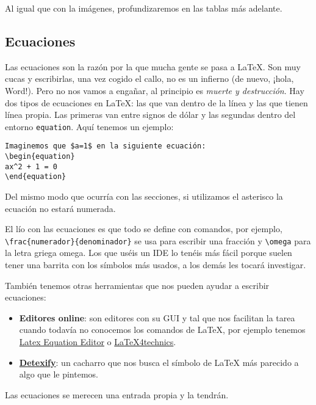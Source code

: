 Al igual que con la imágenes, profundizaremos en las tablas más
adelante.

\subsection{Ecuaciones}\label{ecuaciones}

Las ecuaciones son la razón por la que mucha gente se pasa a LaTeX. Son
muy cucas y escribirlas, una vez cogido el callo, no es un infierno (de
nuevo, ¡hola, Word!). Pero no nos vamos a engañar, al principio es
\emph{muerte y destrucción}. Hay dos tipos de ecuaciones en LaTeX: las
que van dentro de la línea y las que tienen línea propia. Las primeras
van entre signos de dólar y las segundas dentro del entorno
\lstinline!equation!. Aquí tenemos un ejemplo:

\begin{lstlisting}[language={[latex]tex}]
Imaginemos que $a=1$ en la siguiente ecuación:
\begin{equation}
ax^2 + 1 = 0
\end{equation}
\end{lstlisting}

Del mismo modo que ocurría con las secciones, si utilizamos el asterisco
la ecuación no estará numerada.

El lío con las ecuaciones es que todo se define con comandos, por
ejemplo, \lstinline!\frac{numerador}{denominador}! se usa para escribir
una fracción y \lstinline!\omega! para la letra griega omega. Los que
uséis un IDE lo tenéis más fácil porque suelen tener una barrita con los
símbolos más usados, a los demás les tocará investigar.

También tenemos otras herramientas que nos pueden ayudar a escribir
ecuaciones:

\begin{itemize}
\item
  \textbf{Editores online}: son editores con su GUI y tal que nos
  facilitan la tarea cuando todavía no conocemos los comandos de LaTeX,
  por ejemplo tenemos
  \href{http://www.numberempire.com/texequationeditor/equationeditor.php\%22}{Latex
  Equation Editor} o
  \href{https://www.latex4technics.com/}{LaTeX4technics}.
\item
  \href{http://detexify.kirelabs.org/classify.html}{\textbf{Detexify}}:
  un cacharro que nos busca el símbolo de LaTeX más parecido a algo que
  le pintemos.
\end{itemize}

Las ecuaciones se merecen una entrada propia y la tendrán.

